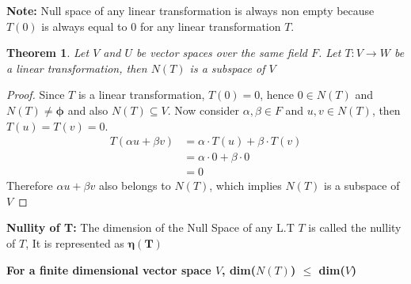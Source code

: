 \documentclass[a4paper, titlepage]{article}
\newtheorem{theorem}{Theorem}[section]
\begin{document}
        \textbf{Note:} Null space of any linear transformation is always
        non empty because $T(0)$ is always equal to $0$ for any linear 
        transformation $T$.

        \begin{theorem}
            Let $V$ and $U$ be vector spaces over the same field $F$. 
            Let $T: V \rightarrow W$ be a linear transformation, then
            $N(T)$ is a subspace of $V$
        \end{theorem}
        \begin{proof}
            Since $T$ is a linear transformation, $T(0) = 0$, hence
            $0 \in N(T)$ and $N(T) \neq \bm{\phi}$ and also 
            $N(T) \subseteq V$. Now consider $\alpha, \beta \in F$ and 
            $u, v \in N(T)$, then $T(u) = T(v) = 0$.
            \begin{align*}
                T(\alpha u + \beta v) &= \alpha\cdot T(u) + \beta\cdot T(v) \\
                                                  &= \alpha\cdot 0 + \beta\cdot 0 \\
                                                  &= 0
            \end{align*}
            Therefore $\alpha u + \beta v$ also belongs to $N(T)$, which
            implies $N(T)$ is a subspace of $V$
        \end{proof}
        
        \noindent \textbf{Nullity of T: }The dimension of the Null
        Space of any L.T $T$ is called the nullity of $T$, It is 
        represented as $\bm{\eta(T)}$
        
        \noindent \textbf{For a finite dimensional vector space 
        $V$, dim($N(T)$) $\le$ dim($V$)}
\end{document}
